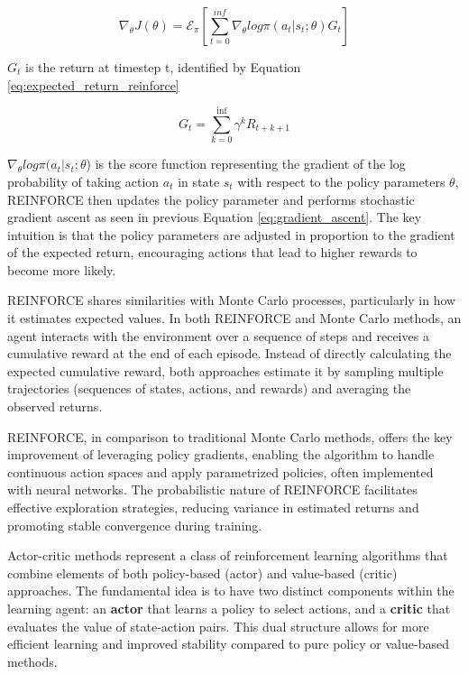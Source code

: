 \begin{equation}
    \label{eq:gradient_ascent_rein}
    \nabla_\theta J(\theta) = \mathcal{E}_\pi[\sum_{t=0}^{inf}\nabla_\theta log \pi(a_t|s_t;\theta)G_t]
\end{equation}

$G_t$ is the return at timestep t, identified by Equation \ref{eq:expected_return_reinforce}

\begin{equation}
    \label{eq:expected_return_reinforce}
    G_t = \sum_{k=0}^{\inf} \gamma^k R_{t+k+1}
\end{equation}

$\nabla_\theta log \pi(a_t|s_t;\theta$) is the score function representing the gradient of the log probability of taking action $a_t$ in state $s_t$ with respect to the policy parameters $\theta$, REINFORCE then updates the policy parameter and performs stochastic gradient ascent as seen in previous Equation \ref{eq:gradient_ascent}. The key intuition is that the policy parameters are adjusted in proportion to the gradient of the expected return, encouraging actions that lead to higher rewards to become more likely.

REINFORCE shares similarities with Monte Carlo processes, particularly in how it estimates expected values. In both REINFORCE and Monte Carlo methods, an agent interacts with the environment over a sequence of steps and receives a cumulative reward at the end of each episode. Instead of directly calculating the expected cumulative reward, both approaches estimate it by sampling multiple trajectories (sequences of states, actions, and rewards) and averaging the observed returns.

REINFORCE, in comparison to traditional Monte Carlo methods, offers the key improvement of leveraging policy gradients, enabling the algorithm to handle continuous action spaces and apply parametrized policies, often implemented with neural networks. The probabilistic nature of REINFORCE facilitates effective exploration strategies, reducing variance in estimated returns and promoting stable convergence during training.

Actor-critic methods represent a class of reinforcement learning algorithms that combine elements of both policy-based (actor) and value-based (critic) approaches. The fundamental idea is to have two distinct components within the learning agent: an \textbf{actor} that learns a policy to select actions, and a \textbf{critic} that evaluates the value of state-action pairs. This dual structure allows for more efficient learning and improved stability compared to pure policy or value-based methods.

